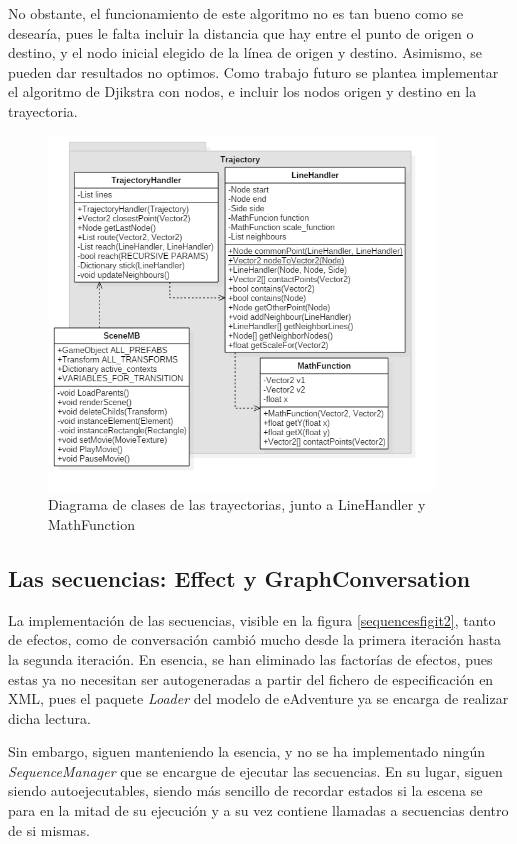 No obstante, el funcionamiento de este algoritmo no es tan bueno como se desearía, pues le falta incluir la distancia que hay entre el punto de origen o destino, y el nodo inicial elegido de la línea de origen y destino. Asimismo, se pueden dar resultados no optimos. Como trabajo futuro se plantea implementar el algoritmo de Djikstra con nodos, e incluir los nodos origen y destino en la trayectoria.

\begin{figure}[h!]
	\centerline{\includegraphics[height=3.7in]{figures/it2/TrajectoryHandler.png}}
	\caption[TrajectoryHandler - Versión Final]{Diagrama de clases de las trayectorias, junto a LineHandler y MathFunction}
	\label{trajectoryfigit2}
\end{figure}

\subsection{Las secuencias: Effect y GraphConversation}
\label{sequencesit2}

La implementación de las secuencias, visible en la figura \ref{sequencesfigit2}, tanto de efectos, como de conversación cambió mucho desde la primera iteración hasta la segunda iteración. En esencia, se han eliminado las factorías de efectos, pues estas ya no necesitan ser autogeneradas a partir del fichero de especificación en XML, pues el paquete \textit{Loader} del modelo de eAdventure ya se encarga de realizar dicha lectura.

Sin embargo, siguen manteniendo la esencia, y no se ha implementado ningún \textit{SequenceManager} que se encargue de ejecutar las secuencias. En su lugar, siguen siendo autoejecutables, siendo más sencillo de recordar estados si la escena se para en la mitad de su ejecución y a su vez contiene llamadas a secuencias dentro de si mismas.


